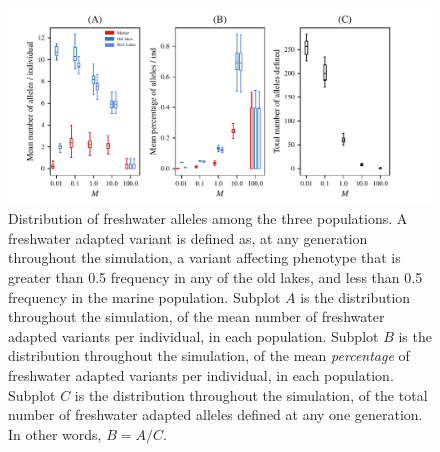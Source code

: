 \documentclass{article}
\begin{document}
\begin{figure}
	\begin{center}
  		\includegraphics{Final_Plots/Freshwater_Alleles.pdf}
  		\caption{
		Distribution of freshwater alleles among the three populations. 
		A freshwater adapted variant is defined as, at any generation throughout the simulation,
		a variant affecting phenotype that is greater than 0.5 frequency in any of the old lakes, 
		and less than 0.5 frequency in the marine population. 
		Subplot $A$ is the distribution throughout the simulation, of the mean number of
		freshwater adapted variants per individual, in each population.
		Subplot $B$ is the distribution throughout the simulation, of the mean \emph{percentage} of
		freshwater adapted variants per individual, in each population. 
		Subplot $C$ is the distribution throughout the simulation, of the total number of
		freshwater adapted alleles defined at any one generation.
		In other words, $B  =  A  /  C$.
		}
		\label{fig:MPFAI}
	\end{center}
\end{figure}
\end{document}
